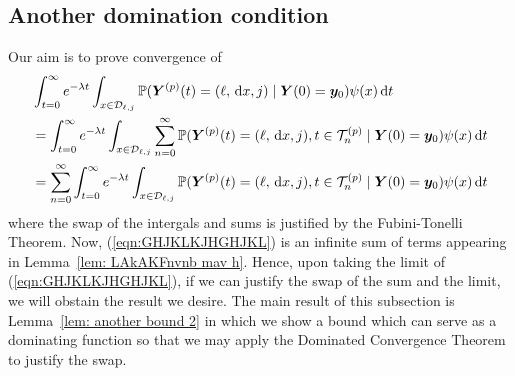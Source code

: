 \subsection{Another domination condition}
Our aim is to prove convergence of 
\begin{align} 
	&\int_{t=0}^\infty e^{-\lambda t}\int_{x\in\mathcal{D}_{\ell,j}}\mathbb P({\boldsymbol Y}^{(p)}(t) = (\ell,\, \mathrm{d} x, j) \mid  \nonumber 
	\boldsymbol Y(0) = \boldsymbol y_0)\psi(x)\, \mathrm{d} t \nonumber
	\\&=\int_{t=0}^\infty e^{-\lambda t}\int_{x\in\mathcal{D}_{\ell,j}}\sum_{n=0}^\infty\mathbb P({\boldsymbol Y}^{(p)}(t) = (\ell,\, \mathrm{d} x, j), t\in\mathcal T_n^{(p)} \mid  \nonumber 
	\boldsymbol Y(0) = \boldsymbol y_0)\psi(x)\, \mathrm{d} t \nonumber
	\\&=\sum_{n=0}^\infty\int_{t=0}^\infty e^{-\lambda t}\int_{x\in\mathcal{D}_{\ell,j}}\mathbb P({\boldsymbol Y}^{(p)}(t) = (\ell,\, \mathrm{d} x, j), t\in\mathcal T_n^{(p)} \mid   
	\boldsymbol Y(0) = \boldsymbol y_0)\psi(x)\, \mathrm{d} t \label{eqn:GHJKLKJHGHJKL}
\end{align}
where the swap of the intergals and sums is justified by the Fubini-Tonelli Theorem. Now, (\ref{eqn:GHJKLKJHGHJKL}) is an infinite sum of terms appearing in Lemma~\ref{lem: LAkAKFnvnb mav h}. Hence, upon taking the limit of (\ref{eqn:GHJKLKJHGHJKL}), if we can justify the swap of the sum and the limit, we will obstain the result we desire. The main result of this subsection is Lemma~\ref{lem: another bound 2} in which we show a bound which can serve as a dominating function so that we may apply the Dominated Convergence Theorem to justify the swap. 




